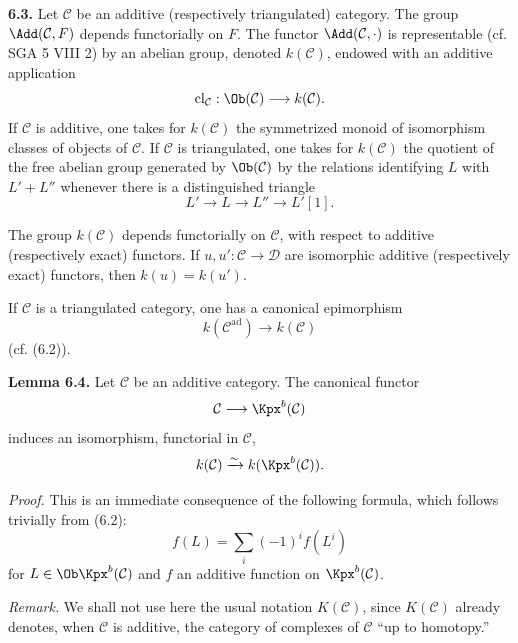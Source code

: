 \documentclass[11pt]{article}
\newcommand{\cl}{\operatorname{cl}}
\begin{document}
\textbf{6.3.} Let \(\mathcal C\) be an additive (respectively triangulated) category. The group \(\Add(\mathcal C,F)\) depends functorially on \(F\). The functor \(\Add(\mathcal C,\cdot)\) is representable (cf. SGA 5 VIII 2) by an abelian group, denoted \(k(\mathcal C)\), endowed with an additive application
\[
  \cl_{\mathcal C}:\Ob(\mathcal C)\longrightarrow k(\mathcal C).
\]
If \(\mathcal C\) is additive, one takes for \(k(\mathcal C)\) the symmetrized monoid of isomorphism classes of objects of \(\mathcal C\). If \(\mathcal C\) is triangulated, one takes for \(k(\mathcal C)\) the quotient of the free abelian group generated by \(\Ob(\mathcal C)\) by the relations identifying \(L\) with \(L'+L''\) whenever there is a distinguished triangle
\[
  L'\longrightarrow L\longrightarrow L''\longrightarrow L'[1].
\]

The group \(k(\mathcal C)\) depends functorially on \(\mathcal C\), with respect to additive (respectively exact) functors. If \(u,u':\mathcal C\to\mathcal D\) are isomorphic additive (respectively exact) functors, then \(k(u)=k(u')\).

If \(\mathcal C\) is a triangulated category, one has a canonical epimorphism
\[
  k(\mathcal C^{\mathrm{ad}})\longrightarrow k(\mathcal C)
\]
(cf. (6.2)).

\textbf{Lemma 6.4.} Let \(\mathcal C\) be an additive category. The canonical functor
\[
  \mathcal C\longrightarrow \Kpx^b(\mathcal C)
\]
induces an isomorphism, functorial in \(\mathcal C\),
\[
  k(\mathcal C)\xrightarrow{\sim} k(\Kpx^b(\mathcal C)).
\]

\emph{Proof.} This is an immediate consequence of the following formula, which follows trivially from (6.2):
\begin{equation}\tag{6.4.1}
  f(L)=\sum_i (-1)^i f(L^i)
\end{equation}
for \(L\in\Ob\Kpx^b(\mathcal C)\) and \(f\) an additive function on \(\Kpx^b(\mathcal C)\).

\emph{Remark.} We shall not use here the usual notation \(K(\mathcal C)\), since \(K(\mathcal C)\) already denotes, when \(\mathcal C\) is additive, the category of complexes of \(\mathcal C\) ``up to homotopy.''
\end{document}
